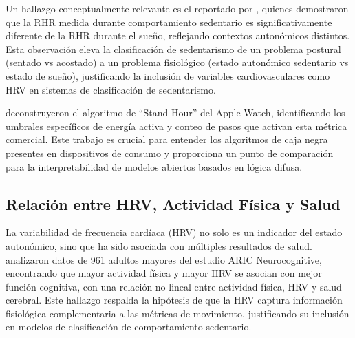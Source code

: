 Un hallazgo conceptualmente relevante es el reportado por \cite{Godkin2025Context}, quienes demostraron que la RHR medida durante comportamiento sedentario es significativamente diferente de la RHR durante el sueño, reflejando contextos autonómicos distintos. Esta observación eleva la clasificación de sedentarismo de un problema postural (sentado vs acostado) a un problema fisiológico (estado autonómico sedentario vs estado de sueño), justificando la inclusión de variables cardiovasculares como HRV en sistemas de clasificación de sedentarismo.

\cite{Lyons2024StandHour} deconstruyeron el algoritmo de ``Stand Hour'' del Apple Watch, identificando los umbrales específicos de energía activa y conteo de pasos que activan esta métrica comercial. Este trabajo es crucial para entender los algoritmos de caja negra presentes en dispositivos de consumo y proporciona un punto de comparación para la interpretabilidad de modelos abiertos basados en lógica difusa.


\subsection{Relación entre HRV, Actividad Física y Salud}
\label{subsec:hrv_cognicion}

La variabilidad de frecuencia cardíaca (HRV) no solo es un indicador del estado autonómico, sino que ha sido asociada con múltiples resultados de salud. \cite{Marino2024ARIC} analizaron datos de 961 adultos mayores del estudio ARIC Neurocognitive, encontrando que mayor actividad física y mayor HRV se asocian con mejor función cognitiva, con una relación no lineal entre actividad física, HRV y salud cerebral. Este hallazgo respalda la hipótesis de que la HRV captura información fisiológica complementaria a las métricas de movimiento, justificando su inclusión en modelos de clasificación de comportamiento sedentario.


